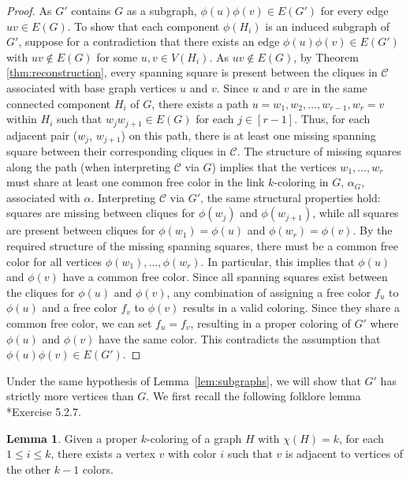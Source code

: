 \documentclass{amsart}
\theoremstyle{hypothesisstyle}
\theoremstyle{definition}
\newtheorem{lemma}[theorem]{Lemma}
\theoremstyle{remark}
\numberwithin{equation}{section}
\newcommand{\C}{\mathcal C}
\begin{document}
\begin{proof}
    As $G'$ contains $G$ as a subgraph, $\phi(u)\phi(v)\in E(G')$ for every edge $uv\in E(G)$. To show that each component $\phi(H_i)$ is an induced subgraph of $G'$, suppose for a contradiction that there exists an edge $\phi(u)\phi(v)\in E(G')$ with $uv\notin E(G)$ for some $u, v\in V(H_i)$. As $uv\notin E(G)$, by Theorem \ref{thm:reconstruction}, every spanning square is present between the cliques in $\C$ associated with base graph vertices $u$ and $v$. Since $u$ and $v$ are in the same connected component $H_i$ of $G$, there exists a path $u=w_1,w_2,\dots, w_{r-1},w_r=v$ within $H_i$ such that $w_jw_{j+1}\in E(G)$ for each $j\in[r-1]$. Thus, for each adjacent pair ($w_j$, $w_{j+1}$) on this path, there is at least one missing spanning square between their corresponding cliques in $\C$. The structure of missing squares along the path (when interpreting $\mathcal{C}$ via $G$) implies that the vertices $w_1, \dots, w_r$ must share at least one common free color in the link $k$-coloring in $G$, $\alpha_G$, associated with $\alpha$. Interpreting $\mathcal{C}$ via $G'$, the same structural properties hold: squares are missing between cliques for $\phi(w_j)$ and $\phi(w_{j+1})$, while all squares are present between cliques for $\phi(w_1)=\phi(u)$ and $\phi(w_r)=\phi(v)$. By the required structure of the missing spanning squares, there must be a common free color for all vertices $\phi(w_1),\dots,\phi(w_r)$.  In particular, this implies that $\phi(u)$ and $\phi(v)$ have a common free color. Since all spanning squares exist between the cliques for $\phi(u)$ and $\phi(v)$, any combination of assigning a free color $f_{u}$ to $\phi(u)$ and a free color $f_{v}$ to $\phi(v)$ results in a valid coloring. Since they share a common free color, we can set $f_u=f_{v}$, resulting in a proper coloring of $G'$ where $\phi(u)$ and $\phi(v)$ have the same color. This contradicts the assumption that $\phi(u)\phi(v)\in E(G')$.   \end{proof}

Under the same hypothesis of Lemma~\ref{lem:subgraphs}, we will show that $G'$ has strictly more vertices than $G$. We first recall the following folklore lemma \cite{Wes01}*{Exercise 5.2.7}.

\begin{lemma}\label{lem:rainbow-star} Given a proper $k$-coloring of a graph $H$ with $\chi(H)=k$, for each $1\leq i\leq k$, there exists a vertex $v$ with color $i$ such that $v$ is adjacent to vertices of the other $k-1$ colors.
\end{lemma}
\end{document}
